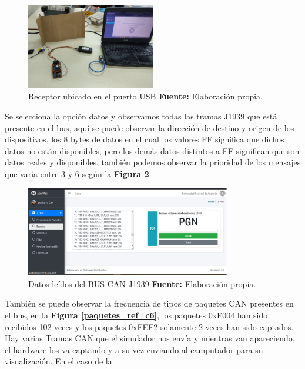 \begin{figure}[H]
	\centering
	\includegraphics[width=0.5\textwidth]{./Cap6imagen/receptor_fig_c6.jpg}
	\caption [Receptor ubicado en el puerto USB.]{Receptor ubicado en el puerto USB \textbf{ Fuente:} %
		Elaboración propia.}
	\label{receptor_ref_c6} %
\end{figure}

Se selecciona la opción datos y observamos todas las tramas J1939 que está presente en el bus, aquí se puede observar la dirección de destino y origen de los dispositivos, los 8 bytes de datos en el cual los valores FF significa que dichos datos no están disponibles, pero los demás datos distintos a FF significan que son datos reales y disponibles, también podemos observar la prioridad de los mensajes que varía entre 3 y 6 según la \textbf{Figura \ref{escucha_ref_c6}}.

\begin{figure}[H]
	\centering
	\includegraphics[width=0.8\textwidth]{./Cap6imagen/escucha_fig_c6.png}
	\caption [Datos leídos del BUS CAN J1939.]{Datos leídos del BUS CAN J1939 \textbf{ Fuente:} %
		Elaboración propia.}
	\label{escucha_ref_c6} %
\end{figure}


También se puede observar la frecuencia de tipos de paquetes CAN presentes en el bus, en la \textbf{Figura \ref{paquetes_ref_c6}}, los paquetes 0xF004 han sido recibidos 102 veces y los paquetes 0xFEF2 solamente 2 veces han sido captados. Hay varias Tramas CAN que el simulador nos envía y mientras van apareciendo, el hardware los va captando y a su vez enviando al camputador para su visualización. En el caso de la 


